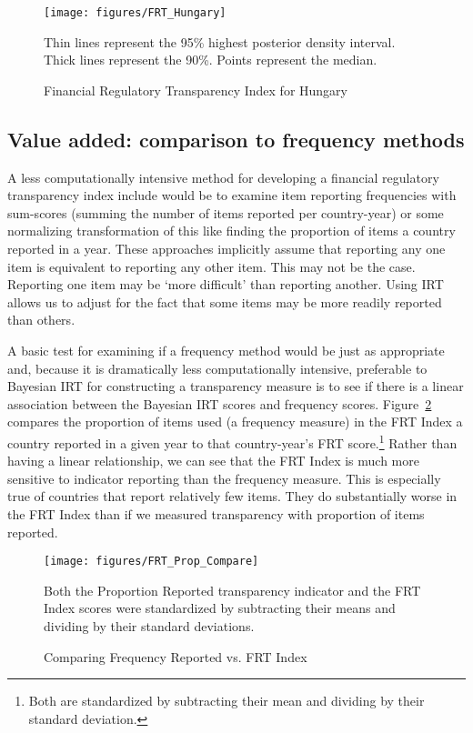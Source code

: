 \documentclass[a4paper]{article}
\begin{document}
{

\begin{figure}
    \caption{Financial Regulatory Transparency Index for Hungary}
    \label{FRTHungary}
    \begin{center}
        \texttt{[image: figures/FRT\_Hungary]}
    \end{center}
    {\scriptsize{Thin lines represent the 95\% highest posterior density interval. Thick lines represent the 90\%. Points represent the median.}}
\end{figure}

\subsection{Value added: comparison to frequency methods}

A less computationally intensive method for developing a financial regulatory transparency index include would be to examine item reporting frequencies with sum-scores (summing the number of items reported per country-year) or some normalizing transformation of this like finding the proportion of items a country reported in a year. These approaches implicitly assume that reporting any one item is equivalent to reporting any other item. This may not be the case. Reporting one item may be `more difficult' than reporting another. Using IRT allows us to adjust for the fact that some items may be more readily reported than others.

A basic test for examining if a frequency method would be just as appropriate and, because it is dramatically less computationally intensive, preferable to Bayesian IRT for constructing a transparency measure is to see if there is a linear association between the Bayesian IRT scores and frequency scores. Figure~\ref{CompFreqFRT} compares the proportion of items used (a frequency measure) in the FRT Index a country reported in a given year to that country-year's FRT score.\footnote{Both are standardized by subtracting their mean and dividing by their standard deviation.} Rather than having a linear relationship, we can see that the FRT Index is much more sensitive to indicator reporting than the frequency measure. This is especially true of countries that report relatively few items. They do substantially worse in the FRT Index than if we measured transparency with proportion of items reported.

\begin{figure}
    \caption{Comparing Frequency Reported vs. FRT Index}
    \label{CompFreqFRT}
    \begin{center}
        \texttt{[image: figures/FRT\_Prop\_Compare]}
    \end{center}
    {\scriptsize{Both the Proportion Reported transparency indicator and the FRT Index scores were standardized by subtracting their means and dividing by their standard deviations.}}
\end{figure}


}
\end{document}
